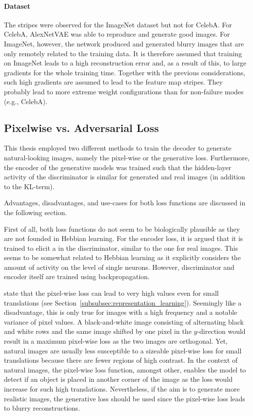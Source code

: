\paragraph{Dataset}
The stripes were observed for the ImageNet dataset but not for CelebA.
For CelebA, AlexNetVAE was able to reproduce and generate good images.
For ImageNet, however, the network produced and generated blurry images that are only remotely related to the training data.
It is therefore assumed that training on ImageNet leads to a high reconstruction error and, as a result of this, to large gradients for the whole training time.
Together with the previous considerations, such high gradients are assumed to lead to the feature map stripes.
They probably lead to more extreme weight configurations than for non-failure modes (e.g., CelebA).

\subsection{Pixelwise vs. Adversarial Loss}\label{subsec:pixelwise-vs.-adversarial-loss}
This thesis employed two different methods to train the decoder to generate natural-looking images, namely the pixel-wise or the generative loss.
Furthermore, the encoder of the generative models was trained such that the hidden-layer activity of the discriminator is similar for generated and real images (in addition to the KL-term).

Advantages, disadvantages, and use-cases for both loss functions are discussed in the following section.

First of all, both loss functions do not seem to be biologically plausible as they are not founded in Hebbian learning.
For the encoder loss, it is argued that it is trained to elicit a  in the discriminator, similar to the one for real images.
This  seems to be somewhat related to Hebbian learning as it explicitly considers the amount of activity on the level of single neurons.
However, discriminator and encoder itself are trained using backpropagation.

\citet{larsen2015autoencoding} state that the pixel-wise loss can lead to very high values even for small translations (see Section~\ref{subsubsec:representation_learning}).
Seemingly like a disadvantage, this is only true for images with a high frequency and a notable variance of pixel values.
A black-and-white image consisting of alternating black and white rows and the same image shifted by one pixel in the $y$-direction would result in a maximum pixel-wise loss as the two images are orthogonal.
Yet, natural images are usually less susceptible to a sizeable pixel-wise loss for small translations because there are fewer regions of high contrast.
In the context of natural images, the pixel-wise loss function, amongst other, enables the model to detect if an object is placed in another corner of the image as the loss would increase for such high translations.
Nevertheless, if the aim is to generate more realistic images, the generative loss should be used since the pixel-wise loss leads to blurry reconstructions.

